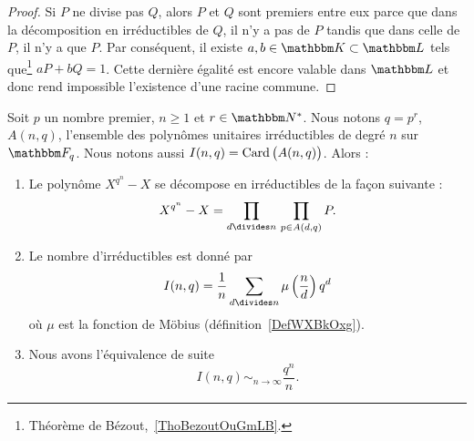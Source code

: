 \begin{proof}
    Si \( P\) ne divise pas \( Q\), alors \( P\) et \( Q\) sont premiers entre eux parce que dans la décomposition en irréductibles de \( Q\), il n'y a pas de \( P\) tandis que dans celle de \( P\), il n'y a que \( P\). Par conséquent, il existe \( a,b\in \eK\subset\eL\) tels que\footnote{Théorème de Bézout,~\ref{ThoBezoutOuGmLB}.} \( aP+bQ=1\). Cette dernière égalité est encore valable dans \( \eL\) et donc rend impossible l'existence d'une racine commune.
\end{proof}

\begin{proposition} \label{PropVFNOvzZ}
    Soit \( p\) un nombre premier, \( n\geq 1\) et \( r\in \eN^*\). Nous notons \( q=p^r\), \( A(n,q)\), l'ensemble des polynômes unitaires irréductibles de degré \( n\) sur \( \eF_q\). Nous notons aussi \( I(n,q)=\operatorname{Card}\big( A(n,q) \big)\). Alors :
    \begin{enumerate}
        \item
            Le polynôme \( X^{q^n}-X\) se décompose en irréductibles de la façon suivante :
            \begin{equation}
                X^{q^n}-X=\prod_{d\divides n}\,\prod_{p\in A(d,q)}P.
            \end{equation}
        \item
            Le nombre d'irréductibles est donné par
            \begin{equation}
                I(n,q)=\frac{1}{ n }\sum_{d\divides n}\mu\left( \frac{ n }{ d } \right)q^d
            \end{equation}
            où \( \mu\) est la fonction de Möbius (définition~\ref{DefWXBkOxg}).
        \item
            Nous avons l'équivalence de suite
            \begin{equation}
                I(n,q)\sim_{n\to\infty}\frac{ q^n }{ n }.
            \end{equation}
    \end{enumerate}
\end{proposition}

